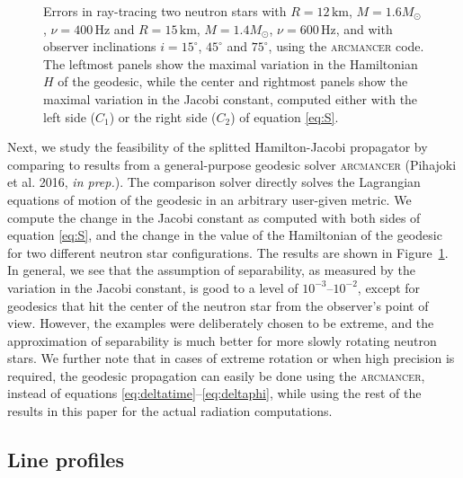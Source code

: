 \documentclass[iop, usenatbib]{emulateapj}
\newcommand{\Msun}{\ensuremath{M_{\odot}}}
\begin{document}
\begin{figure}
\caption{\label{fig:H_C1_C2}
    Errors in ray-tracing two neutron stars with $R=12\,\mathrm{km}$, $M=1.6\Msun$, $\nu=400\,\mathrm{Hz}$ and $R=15\,\mathrm{km}$, $M=1.4\Msun$, $\nu=600\,\mathrm{Hz}$, and with observer inclinations $i=15^\circ$, $45^\circ$ and $75^\circ$, using the \textsc{arcmancer} code.
    The leftmost panels show the maximal variation in the Hamiltonian $H$ of the geodesic, while the center and rightmost panels show the maximal variation in the Jacobi constant, computed either with the left side ($C_1$) or the right side ($C_2$) of equation \eqref{eq:S}.
  }
\end{figure}

Next, we study the feasibility of the splitted Hamilton-Jacobi propagator by comparing to results from a general-purpose geodesic solver \textsc{arcmancer} (Pihajoki et al. 2016, \emph{in prep.}).
The comparison solver directly solves the Lagrangian equations of motion of the geodesic in an arbitrary user-given metric. We compute the change in the Jacobi constant as computed with both sides of equation \eqref{eq:S}, and the change in the value of the Hamiltonian of the geodesic for two different neutron star configurations. The results are shown in Figure~\ref{fig:H_C1_C2}. In general, we see that the assumption of separability, as measured by the variation in the Jacobi constant, is good to a level of $10^{-3}$--$10^{-2}$, except for geodesics that hit the center of the neutron star from the observer's point of view. However, the examples were deliberately chosen to be extreme, and the approximation of separability is much better for more slowly rotating neutron stars.
We further note that in cases of extreme rotation or when high precision is required, the geodesic propagation can easily be done using the \textsc{arcmancer}, instead of equations \eqref{eq:deltatime}--\eqref{eq:deltaphi}, while using the rest of the results in this paper for the actual radiation computations.

\subsection{Line profiles}
\end{document}
